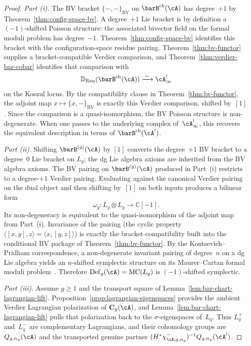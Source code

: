 \begin{proof}
\emph{Part (i).}
The BV bracket $\{-,-\}_{\mathrm{BV}}$ on $\barB^{\mathrm{ch}}(\cA)$
has degree~$+1$ by Theorem~\ref{thm:config-space-bv}. A degree~$+1$
Lie bracket is by definition a $(-1)$-shifted Poisson structure: the
associated bivector field on the formal moduli problem has degree~$-1$.
Theorem~\ref{thm:config-space-bv} identifies this bracket with the
configuration-space residue pairing. Theorem~\ref{thm:bv-functor}
supplies a bracket-compatible Verdier comparison, and
Theorem~\ref{thm:verdier-bar-cobar} identifies that comparison with
\[
\mathbb{D}_{\operatorname{Ran}}(\barB^{\mathrm{ch}}(\cA))
\xrightarrow{\;\sim\;}
\cA^!_\infty
\]
on the Koszul locus. By the compatibility clause in
Theorem~\ref{thm:bv-functor}, the adjoint map
$x \mapsto \{x,-\}_{\mathrm{BV}}$ is exactly this Verdier comparison,
shifted by~$[1]$. Since the comparison is a quasi-isomorphism, the
BV Poisson structure is non-degenerate. When one passes to the
underlying complex of~$\cA^!_\infty$, this recovers the equivalent
description in terms of $\barB^{\mathrm{ch}}(\cA^!)$.

\emph{Part (ii).}
Shifting $\barB^{(g)}(\cA)$ by $[1]$ converts the degree~$+1$ BV
bracket to a degree~$0$ Lie bracket on $L_g$; the dg Lie algebra
axioms are inherited from the BV algebra axioms. The BV pairing on
$\barB^{(g)}(\cA)$ produced in Part~(i) restricts to a degree-$+1$
Verdier pairing. Evaluating against the canonical Verdier pairing on
the dual object and then shifting by~$[1]$ on both inputs produces a
bilinear form
\[
\omega_g \colon L_g \otimes L_g \longrightarrow \mathbb{C}[-1].
\]
Its non-degeneracy is equivalent to the quasi-isomorphism of the
adjoint map from Part~(i).
Invariance of the pairing (the cyclic property
$\langle [x,y], z \rangle = \langle x, [y,z] \rangle$)
is exactly the bracket-compatibility built into the conditional BV
package of Theorem~\ref{thm:bv-functor}. By the
Kontsevich--Pridham correspondence, a non-degenerate invariant pairing
of degree~$n$ on a dg Lie algebra yields an $n$-shifted symplectic
structure on its Maurer--Cartan formal moduli problem~\cite{Pridham17}.
Therefore $\mathrm{Def}_g(\cA) = \mathrm{MC}(L_g)$ is
$(-1)$-shifted symplectic.

\emph{Part (iii).}
Assume $g \geq 1$ and the transport square of
Lemma~\ref{lem:bar-chart-lagrangian-lift}. Proposition~\ref{prop:lagrangian-eigenspaces}
provides the ambient Verdier Lagrangian polarization of
$\mathbf{C}_g(\cA)$, and
Lemma~\ref{lem:bar-chart-lagrangian-lift} pulls that polarization back
to the $\sigma$-eigenspaces of~$L_g$. Thus
$L_g^+$ and~$L_g^-$ are complementary Lagrangians, and their
cohomology groups are $Q_{g,n_g}(\cA)$ and the transported genuine
partner
$(H^*\chi^-_{\cA;g,n_g})^{-1}Q_{g,n_g}(\cA^!)$.
\end{proof}

